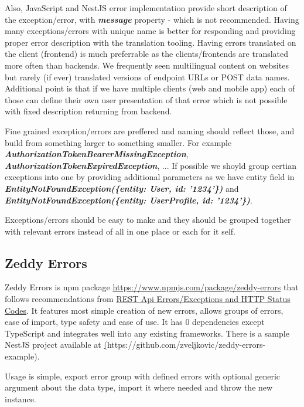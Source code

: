 \documentclass[lang=en,color=green]{elegantbook}
\newcommand{\bi}[1]{\textit{\textbf{#1}}}
\begin{document}
Also, JavaScript and NestJS error implementation provide short description of the exception/error,
with \bi{message} property - which is not recommended. Having many exceptions/errors
with unique name is better for responding and providing proper error description with
the translation tooling. Having errors translated on the client (frontend) is much preferrable
as the clients/frontends are translated more often than backends. We frequently seen
multilingual content on websites but rarely (if ever) translated versions of endpoint URLs or
POST data names. Additional point is that if we have multiple clients (web and mobile app)
each of those can define their own user presentation of that error which is not possible
with fixed description returning from backend.

Fine grained exception/errors are preffered and naming should reflect those, and build
from something larger to something smaller. For example \bi{AuthorizationTokenBearerMissingException},
\bi{AuthorizationTokenExpiredException}, ... If possible we shoyld group certian exceptions into
one by providing additional parameters as we have entity field in \bi{EntityNotFoundException(\{entity: User, id: '1234'\})}
and \bi{EntityNotFoundException(\{entity: UserProfile, id: '1234'\})}.

Exceptions/errors should be easy to make and they should be grouped together with relevant
errors instead of all in one place or each for it self.

\subsection{Zeddy Errors}

Zeddy Errors is npm package \href{https://www.npmjs.com/package/zeddy-errors}{https://www.npmjs.com/package/zeddy-errors} that follows recommendations from
\hyperref[sec:REST Api Errors/Exceptions and HTTP Status Codes]{REST Api Errors/Exceptions and HTTP Status Codes}.
It features most simple creation of new errors, allows groups of errors, ease of import,
type safety and ease of use. It has 0 dependencies except TypeScript and integrates well into
any existing frameworks. There is a sample NestJS project available at \href{https://github.com/zveljkovic/zeddy-errors-example}(https://github.com/zveljkovic/zeddy-errors-example).

Usage is simple, export error group with defined errors with optional generic argument about the data type,
import it where needed and throw the new instance.
\end{document}
